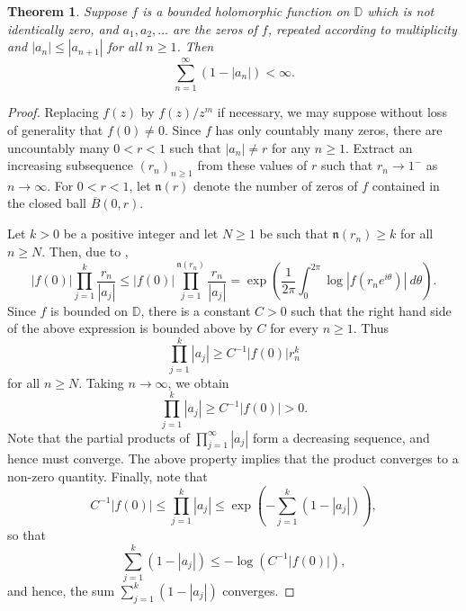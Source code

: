 \documentclass[11pt]{article}
\theoremstyle{thmstyle}
\newtheorem{theorem}{Theorem}[section]
\theoremstyle{defstyle}
\newcommand{\bbD}{\mathbb{D}} %
\newcommand{\frakn}{\mathfrak{n}} %
\renewcommand{\le}{\leqslant}
\renewcommand{\ge}{\geqslant}
\begin{document}
\begin{theorem}
    Suppose $f$ is a bounded holomorphic function on $\bbD$ which is not identically zero, and $a_1, a_2, \dots$ are the zeros of $f$, repeated according to multiplicity and $|a_n|\le |a_{n + 1}|$ for all $n\ge 1$. Then 
    \begin{equation*}
        \sum_{n = 1}^\infty (1 - |a_n|) < \infty.
    \end{equation*}
\end{theorem}
\begin{proof}
    Replacing $f(z)$ by $f(z)/z^m$ if necessary, we may suppose without loss of generality that $f(0)\ne 0$. Since $f$ has only countably many zeros, there are uncountably many $0 < r < 1$ such that $|a_n|\ne r$ for any $n\ge 1$. Extract an increasing subsequence $(r_n)_{n\ge 1}$ from these values of $r$ such that $r_n\to 1^-$ as $n\to\infty$. For $0 < r < 1$, let $\frakn(r)$ denote the number of zeros of $f$ contained in the closed ball $\overline B(0, r)$.

    Let $k > 0$ be a positive integer and let $N\ge 1$ be such that $\frakn(r_n)\ge k$ for all $n\ge N$. Then, due to , 
    \begin{equation*}
        |f(0)|\prod_{j = 1}^k\frac{r_n}{|a_j|}\le|f(0)|\prod_{j = 1}^{\frakn(r_n)}\frac{r_n}{|a_j|} = \exp\left(\frac{1}{2\pi}\int_0^{2\pi}\log|f(r_n e^{i\theta})|~d\theta\right).
    \end{equation*}
    Since $f$ is bounded on $\bbD$, there is a constant $C > 0$ such that the right hand side of the above expression is bounded above by $C$ for every $n\ge 1$. Thus 
    \begin{equation*}
        \prod_{j = 1}^k |a_j|\ge C^{-1}|f(0)| r_n^k
    \end{equation*}
    for all $n\ge N$. Taking $n\to\infty$, we obtain 
    \begin{equation*}
        \prod_{j = 1}^k |a_j|\ge C^{-1}|f(0)| > 0.
    \end{equation*}
    Note that the partial products of $\displaystyle\prod_{j = 1}^\infty |a_j|$ form a decreasing sequence, and hence must converge. The above property implies that the product converges to a non-zero quantity. Finally, note that 
    \begin{equation*}
        C^{-1}|f(0)|\le\prod_{j = 1}^k |a_j|\le\exp\left(-\sum_{j = 1}^k (1 - |a_j|)\right),
    \end{equation*}
    so that 
    \begin{equation*}
        \sum_{j = 1}^k (1 - |a_j|)\le -\log\left(C^{-1}|f(0)|\right),
    \end{equation*}
    and hence, the sum $\displaystyle\sum_{j = 1}^k (1 - |a_j|)$ converges.
\end{proof}
\end{document}
